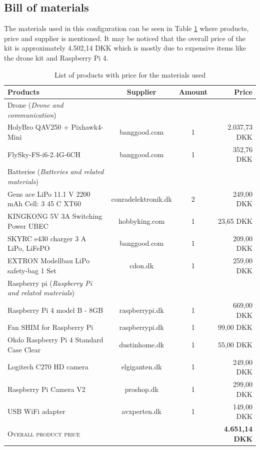 \documentclass[../Head/report.tex]{subfiles}
\begin{document}
\subsection{Bill of materials}
\label{sec:bill_of_materials}

The materials used in this configuration can be seen in Table \ref{tab:bill_of_materials} where products, price and supplier is mentioned. It may be noticed that the overall price of the kit is approximately 4.502,14 DKK which is mostly due to expensive items like the drone kit and Raspberry Pi 4.   

\newcommand{\done}{\cellcolor{teal}done}  %
\newcommand{\hcyan}[1]{{\color{teal} #1}}

\begin{table}[H]
\centering
\caption{List of products with price for the materials used}
\label{tab:bill_of_materials}
\begin{tabular}{lccr}
\toprule
Products & Supplier & Amount & Price\\
\midrule

Drone (\textit{Drone and communication}) \\
\phantom{ZZ} HolyBro QAV250 + Pixhawk4-Mini & banggood.com & 1 & 2.037,73 DKK\\
\phantom{ZZ} FlySky-FS-i6-2.4G-6CH & banggood.com & 1 & 352,76 DKK \\

Batteries (\textit{Batteries and related materials}) & \\
\phantom{ZZ} Gens ace LiPo 11.1 V 2200 mAh Cell: 3 45 C XT60 & conradelektronik.dk & 2 & 249,00 DKK \\
\phantom{ZZ} KINGKONG 5V 3A Switching Power UBEC & hobbyking.com & 1 & 23,65 DKK \\
\phantom{ZZ} SKYRC e430 charger 3 A LiPo, LiFePO & banggood.com & 1 & 209,00 DKK \\
\phantom{ZZ} EXTRON Modellbau LiPo safety-bag 1 Set & cdon.dk & 1 & 259,00 DKK \\

Raspberry pi (\textit{Raspberry Pi and related materials}) & \\
\phantom{ZZ} Raspberry Pi 4 model B - 8GB & raspberrypi.dk & 1 & 669,00 DKK \\
\phantom{ZZ} Fan SHIM for Raspberry Pi & raspberrypi.dk & 1 & 99,00 DKK \\
\phantom{ZZ} Okdo Raspberry Pi 4 Standard Case Clear & dustinhome.dk & 1 & 55,00 DKK \\
\phantom{ZZ} Logitech C270 HD camera & elgiganten.dk & 1 & 249,00 DKK \\
\phantom{ZZ} Raspberry Pi Camera V2 & proshop.dk & 1 & 299,00 DKK \\
\phantom{ZZ} USB WiFi adapter & avxperten.dk & 1 & 149,00 DKK \\

\textsc{Overall product price} & & & \textbf{4.651,14 DKK} \\

\bottomrule                
\end{tabular}
\end{table}
\end{document}
